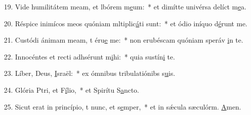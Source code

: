 19. Vide humilitátem meam, et lbórem m\uline{e}um:~* et dimítte univérsa delíct m\uline{e}a.\par 
20. Réspice inimícos meos quóniam mltiplic\uline{á}ti sunt:~* et ódio iníquo d\uline{é}runt me.\par 
21. Custódi ánimam meam, t éru\uline{e} me:~* non erubéscam quóniam speráv \uline{i}n te.\par 
22. Innocéntes et recti adhsérunt m\uline{i}hi:~* quia sustín\uline{i} te.\par 
23. Líber, Deus, \uline{I}sraël:~* ex ómnibus tribulatiónibs s\uline{u}is.\par 
24. Glória Ptri, et F\uline{í}lio,~* et Spirítu S\uline{a}ncto.\par 
25. Sicut erat in princípio, t nunc, et s\uline{e}mper,~* et in sǽcula sæculórm. \uline{A}men.\par 
